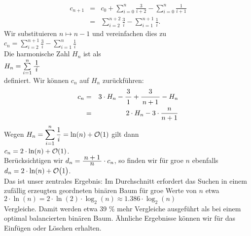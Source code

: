 \begin{eqnarray*}  
  c_{n+1} & = & c_0 + \sum\limits_{i=0}^{n} \frac{3}{i+2} - \sum\limits_{i=0}^{n} \frac{1}{i+1} 
\\[0.2cm]
          & = & \sum\limits_{i=2}^{n+2} \frac{3}{i} - \sum\limits_{i=1}^{n+1} \frac{1}{i}.
\end{eqnarray*}
Wir substituieren $n \mapsto n-1$ und vereinfachen dies zu 
\\[0.2cm]
\hspace*{1.3cm}
$c_{n} =  \displaystyle\sum\limits_{i=2}^{n+1} \frac{3}{i} - \sum\limits_{i=1}^{n} \frac{1}{i}$
\\[0.2cm]
Die harmonische Zahl $H_n$ ist als
\\[0.2cm]
\hspace*{1.3cm}
$H_n = \sum\limits_{i=1}^{n} \bruch{1}{i}$   
\\[0.2cm]
definiert.  Wir k\"onnen $c_n$ auf $H_n$ zur\"uckf\"uhren: 
\begin{eqnarray*}
   c_n & = & 3 \cdot H_n - \bruch{3}{1} + \bruch{3}{n+1} - H_n \\
       & = & 2 \cdot H_n - 3 \cdot \frac{n}{n+1} 
\end{eqnarray*}
Wegen $H_n = \displaystyle\sum\limits_{i=1}^{n} \frac{1}{i} = \ln(n) + \mathcal{O}(1)$ gilt dann \\[0.2cm]
\hspace*{1.3cm} 
$\displaystyle c_n = 2 \cdot \ln(n) + \mathcal{O}(1)$.
\\[0.2cm]
Ber\"ucksichtigen wir  $d_n = \bruch{n+1}{n}\cdot c_n$, so finden wir f\"ur gro\3e $n$ ebenfalls \\[0.2cm]
\hspace*{1.3cm} $\displaystyle d_n = 2 \cdot \ln(n) + \mathcal{O}\bigl(1\bigr)$.
\\[0.2cm]
Das ist unser zentrales Ergebnis: Im Durchschnitt erfordert das Suchen in einem zuf\"allig
erzeugten geordneten bin\"aren Baum f\"ur gro\3e Werte von $n$ etwa 
\\[0.2cm]
\hspace*{1.3cm}
$2 \cdot \ln(n) = 2 \cdot \ln(2) \cdot \log_2(n) \approx 1.386 \cdot \log_2(n)$ 
\\[0.2cm]
Vergleiche.  Damit werden etwa 39 \% 
mehr Vergleiche ausgef\"uhrt als bei einem optimal balancierten bin\"aren Baum.
Ähnliche Ergebnisse k\"onnen wir f\"ur das Einf\"ugen oder L\"oschen erhalten.

